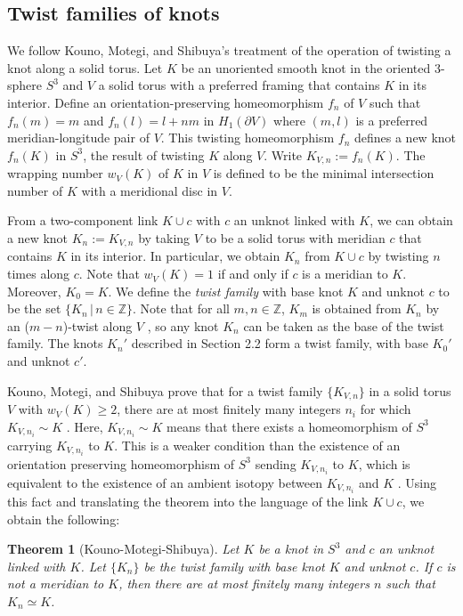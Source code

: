 \documentclass[11pt,usenames,dvipsnames,reqno]{amsart}
\newtheorem{theorem}{Theorem}
\numberwithin{theorem}{section}
\theoremstyle{ex}
\theoremstyle{rem}
\begin{document}
\subsection{Twist families of knots}

We follow Kouno, Motegi, and Shibuya's treatment of the operation of twisting a knot along a solid torus. Let $K$ be an unoriented smooth knot in the oriented 3-sphere $S^3$ and $V$ a solid torus with a preferred framing that contains $K$ in its interior. Define an orientation-preserving homeomorphism $f_n$ of $V$ such that $f_n(m)=m$ and  $f_n(l)=l+nm$ in $H_1(\partial V)$ where $(m, l)$ is a preferred meridian-longitude pair of $V$. This twisting homeomorphism $f_n$ defines a new knot $f_n(K)$ in $S^3$, the result of twisting $K$ along $V$. Write $K_{V,n} := f_n(K)$. The wrapping number $w_V(K)$ of $K$ in $V$ is defined to be the minimal intersection number of $K$ with a meridional disc in $V$.


From a two-component link $K\cup c$ with $c$ an unknot linked with $K$, we can obtain a new knot $K_n := K_{V,n}$ by taking $V$ to be a solid torus with meridian $c$ that contains $K$ in its interior. In particular, we obtain $K_n$ from $K\cup c$ by twisting $n$ times along $c$. Note that $w_V(K)=1$ if and only if $c$ is a meridian to $K$. Moreover, $K_0=K$. We define the \textit{twist family} with base knot $K$ and unknot $c$ to be the set $\{K_n \,|\, n \in \mathbb{Z}\}$. Note that for all $m, n\in\mathbb{Z}$,  $K_m$ is obtained from $K_n$ by an ($m-n$)-twist along $V$ \cite[Remark 2.2]{twisting-knot-types}, so any knot $K_n$ can be taken as the base of the twist family. The knots $K_n'$ described in Section 2.2 form a twist family, with base $K_0'$ and unknot $c'$. 

Kouno, Motegi, and Shibuya prove that for a twist family $\{K_{V,n}\}$ in a solid torus $V$ with $w_V(K)\geq 2$, there are at most finitely many integers $n_i$ for which $K_{V,n_i}\sim K$  \cite[Theorem 3.2]{twisting-knot-types}. Here, $K_{V,n_i}\sim K$ means that there exists a homeomorphism of $S^3$ carrying $K_{V,n_i}$ to $K$. This is a weaker condition than the existence of an orientation preserving homeomorphism of $S^3$ sending $K_{V,n_i}$ to $K$, which is equivalent to the existence of an ambient isotopy between $K_{V,n_i}$ and $K$ \cite[Introduction]{twisting-knot-types}. Using this fact and translating the theorem into the language of the link $K\cup c$, we obtain the following:


\begin{theorem}[Kouno-Motegi-Shibuya] Let $K$ be a knot in $S^3$ and $c$ an unknot linked with $K$. Let $\{K_n\}$ be the twist family with base knot $K$ and unknot $c$. If $c$ is not a meridian to $K$, then there are at most finitely many integers $n$ such that $K_n\simeq K$. 
\end{theorem}
\end{document}
